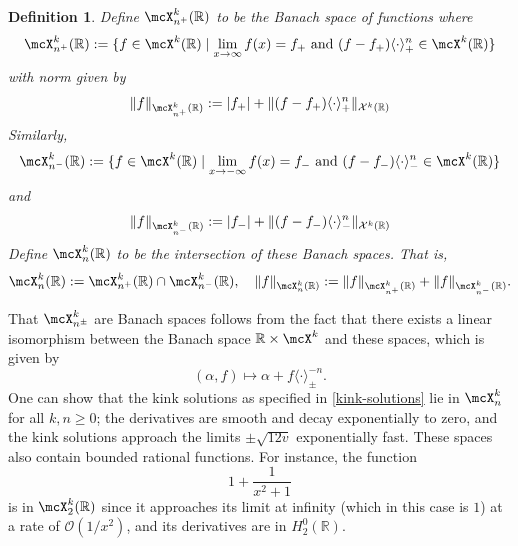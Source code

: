 \documentclass[oneside,reqno]{amsart}
\newcommand{\R}{\mathbb{R}}
\newtheorem{defn}{Definition}[section]
\begin{document}
\begin{defn}
	Define \(\mcX^k_{n^+} (\R)\) to be the Banach space of functions where 
	\begin{equation*}
		\mcX^k_{n^+} (\R) := \{ f \in \mcX^k(\R) \mid \lim_{x\to\infty} f(x) = f_+\text{ and } (f-f_+)\langle\cdot\rangle_+^n \in \mcX^k(\R)\}
	\end{equation*}
	with norm given by
	\begin{equation*}
		\| f \|_{\mcX^k_{n^+}(\R)} := |f_+| + \|(f-f_+) \langle \cdot \rangle_+^n \|_{\mathcal X^k(\R)}
	\end{equation*}
	Similarly, 
	\begin{equation*}
		\mcX^k_{n^-} (\R) := \{ f \in \mcX^k(\R) \mid \lim_{x\to-\infty} f(x) = f_-\text{ and } (f-f_-)\langle\cdot\rangle_-^n \in \mcX^k(\R)\}
	\end{equation*}
	and 
	\begin{equation*}
		\| f \|_{\mcX^k_{n^-}(\R)} := |f_-| + \|(f-f_-) \langle \cdot \rangle_-^n \|_{\mathcal X^k(\R)}
	\end{equation*}
	Define \(\mcX^k_n(\R)\) to be the intersection of these Banach spaces. That is,
	\begin{equation*}
		\mcX^k_n(\R) := \mcX^k_{n^+} (\R) \cap \mcX^k_{n^-} (\R), \quad \| f \|_{\mcX^k_{n} (\R)} := \|f\|_{\mcX^k_{n^+} (\R)} + \|f\|_{\mcX^k_{n^-} (\R)}.
	\end{equation*}
\end{defn}
That \(\mcX^k_{n^\pm}\) are Banach spaces follows from the fact that there exists a linear isomorphism between the Banach space \(\R\times \mcX^k\) and these spaces, which is given by
\begin{equation*}
	(\alpha, f) \mapsto \alpha + f \langle \cdot \rangle^{-n}_{\pm}.
\end{equation*}
One can show that the kink solutions as specified in \cref{kink-solutions} lie in \(\mcX^k_n\) for all \(k,n\geq 0\); the derivatives are smooth and decay exponentially to zero, and the kink solutions approach the limits \(\pm\sqrt{12v}\) exponentially fast. These spaces also contain bounded rational functions. For instance, the function \[1 + \frac 1 {x^2 +1}\] is in \(\mcX^k_2(\R)\) since it approaches its limit at infinity (which in this case is \(1\)) at a rate of \(\mathcal O(1/x^2)\), and its derivatives are in \(H^0_2(\R)\).
\end{document}
